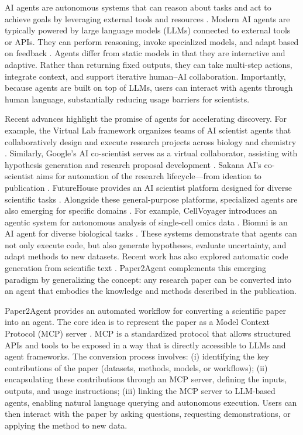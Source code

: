 \documentclass[11pt]{article}
\begin{document}
AI agents are autonomous systems that can reason about tasks and act to achieve goals by leveraging external tools and resources \citep{yao2023react}. Modern AI agents are typically powered by large language models (LLMs) connected to external tools or APIs. They can perform reasoning, invoke specialized models, and adapt based on feedback \citep{xia2024agentless}. Agents differ from static models in that they are interactive and adaptive. Rather than returning fixed outputs, they can take multi-step actions, integrate context, and support iterative human–AI collaboration. Importantly, because agents are built on top of LLMs, users can interact with agents through human language, substantially reducing usage barriers for scientists. 

Recent advances highlight the promise of agents for accelerating discovery. For example, the Virtual Lab framework organizes teams of AI scientist agents that collaboratively design and execute research projects across biology and chemistry \citep{swanson2025virtual}. Similarly, Google’s AI co-scientist serves as a virtual collaborator, assisting with hypothesis generation and research proposal development \citep{gottweis2025towards}. Sakana AI’s co-scientist aims for automation of the research lifecycle—from ideation to publication \citep{Sakana.AI2024}. FutureHouse provides an AI scientist platform designed for diverse scientific tasks \citep{ghareeb2025robin}. Alongside these general-purpose platforms, specialized agents are also emerging for specific domains \citep{qu2025crispr}. For example, CellVoyager introduces an agentic system for autonomous analysis of single-cell omics data \citep{alber2025cellvoyager}. Biomni is an AI agent for diverse biological tasks \citep{huang2025biomni}. These systems demonstrate that agents can not only execute code, but also generate hypotheses, evaluate uncertainty, and adapt methods to new datasets. Recent work has also explored automatic code generation from scientific text \citep{seo2025paper2code, movassaghi2025articles}. Paper2Agent complements this emerging paradigm by generalizing the concept: any research paper can be converted into an agent that embodies the knowledge and methods described in the publication.

Paper2Agent provides an automated workflow for converting a scientific paper into an agent. The core idea is to represent the paper as a Model Context Protocol (MCP) server \citep{hou2025model}. MCP is a standardized protocol that allows structured APIs and tools to be exposed in a way that is directly accessible to LLMs and agent frameworks. The conversion process involves: (i) identifying the key contributions of the paper (datasets, methods, models, or workflows); (ii) encapsulating these contributions through an MCP server, defining the inputs, outputs, and usage instructions; (iii) linking the MCP server to LLM-based agents, enabling natural language querying and autonomous execution. Users can then interact with the paper by asking questions, requesting demonstrations, or applying the method to new data.
\end{document}
